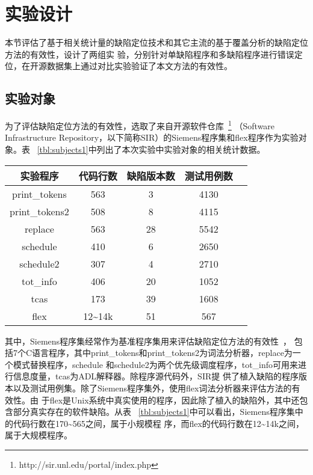 \section{实验设计}
本节评估了基于相关统计量的缺陷定位技术和其它主流的基于覆盖分析的缺陷定位方法的有效性，设计了两组实
验，分别针对单缺陷程序和多缺陷程序进行错误定位，在开源数据集上通过对比实验验证了本文方法的有效性。

\subsection{实验对象}\label{subjects1}

为了评估缺陷定位方法的有效性，选取了来自开源软件仓库~\footnote{http://sir.unl.edu/portal/index.php}
（Software Infrastructure Repository，以下简称SIR）的Siemens程序集和flex程序作为实验对象。表
~\ref{tbl:subjects1}中列出了本次实验中实验对象的相关统计数据。


\begin{center}
\label{tbl:subjects1}
\begin{tabular}{|c|c|c|c|c|}
\hline
实验程序 & 代码行数 & 缺陷版本数 & 测试用例数\\ \hline
print\_tokens & 563 & 3 &4130\\ \hline
print\_tokens2 & 508 & 8 & 4115\\ \hline
replace & 563 & 28 & 5542\\ \hline
schedule & 410 & 6 & 2650\\ \hline
schedule2 & 307 & 4 & 2710\\ \hline
tot\_info & 406 & 20 & 1052\\ \hline
tcas & 173 & 39 & 1608\\ \hline
flex & 12\textasciitilde14k & 51 & 567\\ \hline
\end{tabular}
\end{center}

其中，Siemens程序集经常作为基准程序集用来评估缺陷定位方法的有效性~\cite{guanlian2013,con-prob2018}，
包括7个C语言程序，其中print\_tokens和print\_tokens2为词法分析器，replace为一个模式替换程序，schedule
和schedule2为两个优先级调度程序，tot\_info可用来进行信息度量，tcas为ADL解释器。除程序源代码外，SIR提
供了植入缺陷的程序版本以及测试用例集。除了Siemens程序集外，使用flex词法分析器来评估方法的有效性。由
于flex是Unix系统中真实使用的程序，因此除了植入的缺陷外，其中还包含部分真实存在的软件缺陷。从表
~\ref{tbl:subjects1}中可以看出，Siemens程序集中的代码行数在170\textasciitilde565之间，属于小规模程
序，而flex的代码行数在12\textasciitilde14k之间，属于大规模程序。


